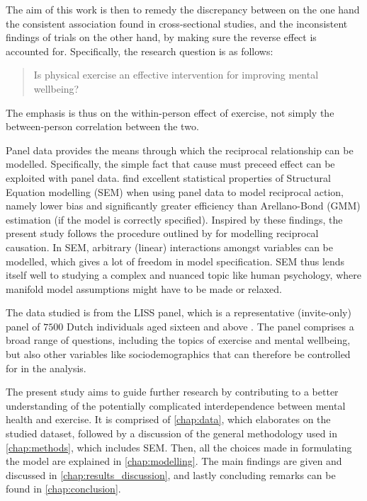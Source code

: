 The aim of this work is then to remedy the discrepancy between on the one hand the consistent association found in
cross-sectional studies, and the inconsistent findings of trials on the other hand, by making sure the reverse effect
is accounted for.
Specifically, the research question is as follows:
\begin{quote}
    Is physical exercise an effective intervention for improving mental wellbeing?
\end{quote}
The emphasis is thus on the within-person effect of exercise, not simply the between-person correlation between the two.

Panel data provides the means through which the reciprocal relationship can be modelled. Specifically, the simple fact
that cause must preceed effect can be exploited with panel data.
 find excellent statistical properties of Structural Equation modelling (SEM)
when using panel data to model reciprocal action, namely lower bias and significantly greater efficiency than Arellano-Bond
(GMM) estimation (if the model is correctly specified).
Inspired by these findings, the present study follows the procedure outlined by 
for modelling reciprocal causation.
In SEM, arbitrary (linear) interactions amongst variables can be modelled, which gives a lot of freedom in model
specification. SEM thus lends itself well to studying a complex and nuanced topic like human psychology,
where manifold model assumptions might have to be made or relaxed.

The data studied is from the LISS panel, which is a representative (invite-only) panel of $7500$ Dutch individuals aged
sixteen and above \cite{scherpenzeel2010liss}. The panel comprises a broad range of questions, including the topics of exercise
and mental wellbeing, but also other variables like sociodemographics that can therefore be controlled for in the analysis.

The present study aims to guide further research by contributing to a better understanding of the potentially
complicated interdependence between mental health and exercise.
It is comprised of \cref{chap:data}, which elaborates on the studied dataset, followed by a discussion of the
general methodology used in \cref{chap:methods}, which includes SEM.
Then, all the choices made in formulating the model are explained in \cref{chap:modelling}.
The main findings are given and discussed in \cref{chap:results_discussion},
and lastly concluding remarks can be found in \cref{chap:conclusion}.
